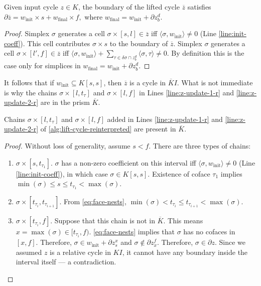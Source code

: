 \documentclass[cleveref,a4paper,english,nolineno]{socg-lipics-v2021}
\newcommand{\prism}[1]{\overline{#1}}
\newcommand{\bdry}{\partial}
\newcommand{\cbdry}{\delta}
\newcommand{\pK}{\prism{K}}
\newcommand{\pz}{\prism{z}}
\newcommand{\ssx}{\sigma}
\newcommand{\tsx}{\tau}
\newcommand{\coeff}[2]{\langle #1, #2 \rangle}
\newcommand{\winit}{w_\textrm{init}}
\newcommand{\wfinal}{w_\textrm{final}}
\begin{document}
\begin{claim}
    \label{clm:lifted-boundary}
    Given input cycle $z \in K$, the boundary of the lifted cycle $\pz$ satisfies
    $
        \bdry \pz = \winit \times s + \wfinal \times f,
    $
    where
    $
        \wfinal = \winit + \bdry z_b^d.
    $
\end{claim}
\begin{proof}
    Simplex $\ssx$ generates a cell $\ssx \times [s,l] \in \pz$ iff
    $\coeff{\ssx}{\winit} \neq 0$ (Line \ref{line:init-coeff}). This cell contributes
    $\ssx \times s$ to the boundary of $\pz$.
    Simplex $\ssx$ generates a cell $\ssx \times [l',f] \in \pz$ iff
    $\coeff{\ssx}{\winit} + \sum_{\tsx \in \cbdry \ssx \cap z_b^d} \coeff{\ssx}{\tsx} \neq 0$.
    By definition this is the case only for simplices in $\wfinal = \winit +
    \bdry z_b^d$.
\end{proof}
It follows that if $\winit \subseteq K[s,s]$, then $\pz$ is a cycle in $\pK I$.
What is not immediate is why the chains $\ssx \times [l,t_\tsx]$ and
$\ssx \times [l,f]$ in
Lines \ref{line:z-update-1-r} and \ref{line:z-update-2-r} are in the prism $\pK$.

\begin{claim}
    Chains $\ssx \times [l, t_\tsx]$ and $\ssx \times [l, f]$ added in Lines
    \ref{line:z-update-1-r} and \ref{line:z-update-2-r} of
    \cref{alg:lift-cycle-reinterpreted} are present in $\pK$.
\end{claim}
\begin{proof}
    Without loss of generality, assume $s < f$. There are three types of chains:
    \begin{enumerate}
        \item
            $\ssx \times [s,t_{\tsx_1}]$.
            $\ssx$ has a non-zero coefficient on this interval iff
            $\coeff{\ssx}{\winit} \neq 0$ (Line \ref{line:init-coeff}), in which case $\ssx \in K[s,s]$.
            Existence of coface $\tsx_1$ implies
            $\min(\ssx) \leq s \leq t_{\tsx_1} < \max(\ssx)$.
        \item
            $\ssx \times [t_{\tsx_i}, t_{\tsx_{i+1}}]$.
            From \cref{eq:face-nests},
            $\min(\ssx) < t_{\tsx_i} \leq t_{\tsx_{i+1}} < \max(\ssx)$.
        \item
            $\ssx \times [t_{\tsx_i}, f]$.
            Suppose that this chain is not in $\pK$.
            This means $x = \max(\ssx) \in [t_{\tsx_i},f)$. \cref{eq:face-nests}
            implies that $\ssx$ has no cofaces in $[x,f]$.
            Therefore, $\ssx \in \winit + \bdry z_s^x$ and
            $\ssx \notin \bdry z_x^f$. Therefore, $\ssx \in \bdry z$. Since we
            assumed $z$ is a relative cycle in $KI$, it cannot have any boundary
            inside the interval itself --- a contradiction.
            \qedhere
    \end{enumerate}
\end{proof}
\end{document}
